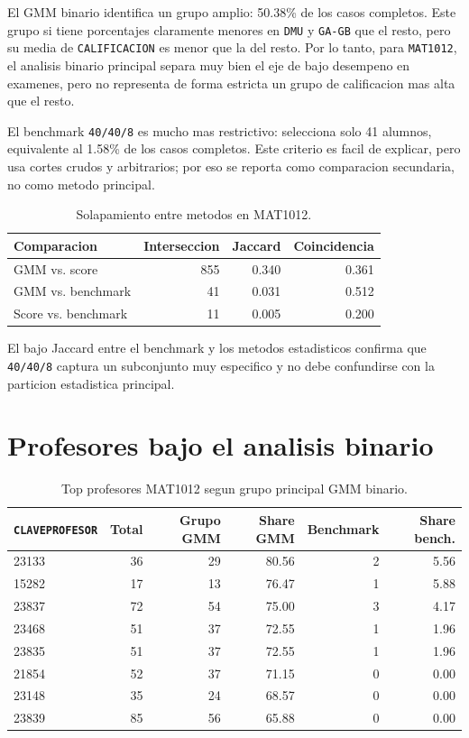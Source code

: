 \documentclass[11pt,letterpaper]{article}
\newcommand{\code}[1]{\texttt{#1}}
\begin{document}
El GMM binario identifica un grupo amplio: 50.38\% de los casos completos. Este grupo si tiene porcentajes claramente menores en \code{DMU} y \code{GA-GB} que el resto, pero su media de \code{CALIFICACION} es menor que la del resto. Por lo tanto, para \code{MAT1012}, el analisis binario principal separa muy bien el eje de bajo desempeno en examenes, pero no representa de forma estricta un grupo de calificacion mas alta que el resto.

El benchmark \code{40/40/8} es mucho mas restrictivo: selecciona solo 41 alumnos, equivalente al 1.58\% de los casos completos. Este criterio es facil de explicar, pero usa cortes crudos y arbitrarios; por eso se reporta como comparacion secundaria, no como metodo principal.

\begin{table}[H]
\centering
\caption{Solapamiento entre metodos en MAT1012.}
\begin{tabular}{lrrr}
\toprule
Comparacion & Interseccion & Jaccard & Coincidencia \\
\midrule
GMM vs. score & 855 & 0.340 & 0.361 \\
GMM vs. benchmark & 41 & 0.031 & 0.512 \\
Score vs. benchmark & 11 & 0.005 & 0.200 \\
\bottomrule
\end{tabular}
\end{table}

El bajo Jaccard entre el benchmark y los metodos estadisticos confirma que \code{40/40/8} captura un subconjunto muy especifico y no debe confundirse con la particion estadistica principal.

\section{Profesores bajo el analisis binario}

\begin{table}[H]
\centering
\caption{Top profesores MAT1012 segun grupo principal GMM binario.}
\begin{tabular}{lrrrrr}
\toprule
\code{CLAVEPROFESOR} & Total & Grupo GMM & Share GMM & Benchmark & Share bench. \\
\midrule
23133 & 36 & 29 & 80.56 & 2 & 5.56 \\
15282 & 17 & 13 & 76.47 & 1 & 5.88 \\
23837 & 72 & 54 & 75.00 & 3 & 4.17 \\
23468 & 51 & 37 & 72.55 & 1 & 1.96 \\
23835 & 51 & 37 & 72.55 & 1 & 1.96 \\
21854 & 52 & 37 & 71.15 & 0 & 0.00 \\
23148 & 35 & 24 & 68.57 & 0 & 0.00 \\
23839 & 85 & 56 & 65.88 & 0 & 0.00 \\
\bottomrule
\end{tabular}
\end{table}
\end{document}
